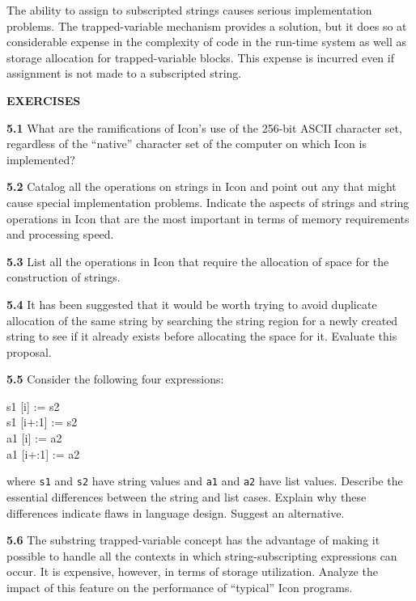 The ability to assign to subscripted strings causes serious
implementation problems. The trapped-variable mechanism provides a
solution, but it does so at considerable expense in the complexity of
code in the run-time system as well as storage allocation for
trapped-variable blocks. This expense is incurred even if assignment
is not made to a subscripted string.

\bigskip

\noindent\textbf{EXERCISES}

\noindent\textbf{5.1} What are the ramifications of Icon's use of the
256-bit ASCII character set, regardless of the ``native'' character
set of the computer on which Icon is implemented?

\noindent\textbf{5.2} Catalog all the operations on strings in Icon
and point out any that might cause special implementation problems.
Indicate the aspects of strings and string operations in Icon that are
the most important in terms of memory requirements and processing
speed.

\noindent\textbf{5.3} List all the operations in Icon that require the
allocation of space for the construction of strings.

\noindent\textbf{5.4} It has been suggested that it would be worth
trying to avoid duplicate allocation of the same string by searching
the string region for a newly created string to see if it already
exists before allocating the space for it. Evaluate this proposal.

\noindent\textbf{5.5} 
Consider the following four expressions:

\begin{iconcode}
\> s1 [i] := s2\\
\> s1 [i+:1] := s2\\
\> a1 [i] := a2\\
\> a1 [i+:1] := a2
\end{iconcode}

\noindent where \texttt{s1} and \texttt{s2} have string values and \texttt{a1}
and \texttt{a2} have list values. Describe the essential differences
between the string and list cases. Explain why these differences
indicate flaws in language design. Suggest an alternative.

\noindent\textbf{5.6} The substring trapped-variable concept has the
advantage of making it possible to handle all the contexts in which
string-subscripting expressions can occur. It is expensive, however,
in terms of storage utilization. Analyze the impact of this feature on
the performance of ``typical'' Icon programs.


